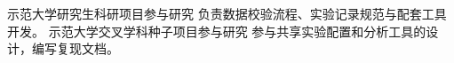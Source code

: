   {示范大学研究生科研项目}{参与研究}{
  负责数据校验流程、实验记录规范与配套工具开发。
}
  {示范大学交叉学科种子项目}{参与研究}{
  参与共享实验配置和分析工具的设计，编写复现文档。
}
